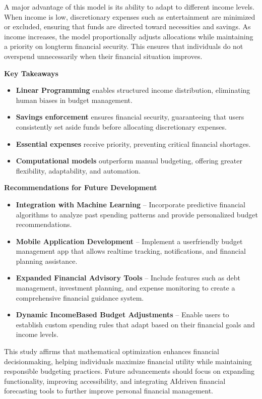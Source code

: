 \documentclass{article}
\begin{document}
A major advantage of this model is its ability to adapt to different income levels. When income is low, discretionary expenses such as entertainment are minimized or excluded, ensuring that funds are directed toward necessities and savings. As income increases, the model proportionally adjusts allocations while maintaining a priority on longterm financial security. This ensures that individuals do not overspend unnecessarily when their financial situation improves.

\textbf{Key Takeaways}
\begin{itemize}
    \item \textbf{Linear Programming} enables structured income distribution, eliminating human biases in budget management.
    \item \textbf{Savings enforcement} ensures financial security, guaranteeing that users consistently set aside funds before allocating discretionary expenses.
    \item \textbf{Essential expenses} receive priority, preventing critical financial shortages.
    \item \textbf{Computational models} outperform manual budgeting, offering greater flexibility, adaptability, and automation.
\end{itemize}

\textbf{Recommendations for Future Development}
\begin{itemize}
    \item \textbf{Integration with Machine Learning} – Incorporate predictive financial algorithms to analyze past spending patterns and provide personalized budget recommendations.
    \item \textbf{Mobile Application Development} – Implement a userfriendly budget management app that allows realtime tracking, notifications, and financial planning assistance.
    \item \textbf{Expanded Financial Advisory Tools} – Include features such as debt management, investment planning, and expense monitoring to create a comprehensive financial guidance system.
    \item \textbf{Dynamic IncomeBased Budget Adjustments} – Enable users to establish custom spending rules that adapt based on their financial goals and income levels.
\end{itemize}

This study affirms that mathematical optimization enhances financial decisionmaking, helping individuals maximize financial utility while maintaining responsible budgeting practices. Future advancements should focus on expanding functionality, improving accessibility, and integrating AIdriven financial forecasting tools to further improve personal financial management.
\end{document}
